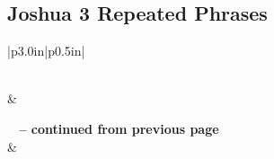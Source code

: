 \subsection{Joshua 3 Repeated Phrases}


\normalsize
 
\begin{center}
\begin{longtable}{|p{3.0in}|p{0.5in}|}
\caption[Joshua 3 Repeated Phrases]{Joshua 3 Repeated Phrases}\label{table:Repeated Phrases Joshua 3} \\
\hline {} &  \\ \hline 
\endfirsthead
 
{{\bfseries \tablename\ \thetable{} -- continued from previous page}} \\  
\hline {} &  \\ \hline 
\endhead
 

\end{longtable}
\end{center}
